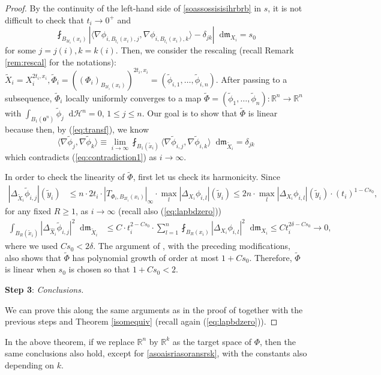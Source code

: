 \documentclass[11pt,reqno]{amsart}
\theoremstyle{definition}
\numberwithin{equation}{section}
\newcommand{\bo}{\bm{0}}
\newcommand{\di}{\mathop{}\!\mathrm{d}}
\newcommand{\meas}{\mathfrak{m}}
\newcommand{\haus}{\mathscr{H}}
\begin{document}
\begin{proof}
By the continuity of the left-hand side of \eqref{soassossisisihrbrb} in $s$,
it is not difficult to check that $t_i \to 0^+$ and
\begin{equation}\label{eq:contradiction1}
    \fint_{B_{3t_i}(x_i)}\left| \langle \nabla \phi_{i, B_{t_i}(x_i), j}, \nabla \phi_{i, B_{t_i}(x_i), k}\rangle -\delta_{jk} \right|\di \meas_{X_i} = s_0
\end{equation}
for some $j=j(i), k=k(i)$. 
Then, we consider the rescaling (recall Remark \ref{rem:rescal} for the notations):
$
    \tilde X_i=X_i^{2t_i, x_i}, \tilde \Phi_i= ((\Phi_i)_{B_{2t_i}(x_i)})^{2t_i, x_i}=(\tilde \phi_{i,1},\ldots, \tilde \phi_{i, n}).
$
After passing to a subsequence, $\tilde \Phi_i$ locally uniformly converges to a map $\tilde \Phi=(\tilde \phi_1, \ldots, \tilde \phi_n):\mathbb{R}^n \to \mathbb{R}^n$ with $\int_{B_1(\bo^n)}\tilde \phi_j\di \haus^n=0$, $1\leq j\leq n$. Our goal is to show that $\tilde \Phi$ is linear because then, by (\ref{eq:transf}), we know
\begin{equation}
    \langle \nabla \tilde \phi_j, \nabla \tilde \phi_k\rangle \equiv \lim_{i\to \infty}\fint_{B_1(\tilde x_i)}\langle \nabla \tilde \phi_{i, j}, \nabla \tilde \phi_{i, k}\rangle \di \meas_{\tilde X_i}=\delta_{jk} 
\end{equation}
which contradicts (\ref{eq:contradiction1}) as $i \to \infty$.

In order to check the linearity of $\tilde \Phi$, first let us check its harmonicity.
Since
\begin{align} |\Delta_{\tilde X_i}\tilde \phi_{i, j}|(\tilde y_i) &\le  n\cdot 2t_i \cdot |T_{\Phi_i, B_{2t_i}(x_i)}|_{\infty}\cdot \max_l|\Delta_{X_i}\phi_{i, l}|(\tilde y_i)  \le 2n \cdot \max_l|\Delta_{X_i} \phi_{i, l}|(\tilde y_i) \cdot (t_i)^{1-Cs_0}, 
\end{align}
 for any fixed $R \ge 1$,  as $i \to \infty$ (recall also (\ref{eq:lapbdzero})) 
\begin{align}
    \int_{B_R(\tilde x_i)}|\Delta_{\hat X_i}\tilde \phi_{i, j}|^2\di \meas_{\tilde X_i}&\le C \cdot t_i^{2-Cs_0}\cdot \sum_{l=1}^n\fint_{B_R(x_i)}|\Delta_{X_i}\phi_{i, l}|^2\di \meas_{X_i}  \le Ct_i^{2\delta-Cs_0} \to 0,
\end{align} 
where we used $Cs_0<2\delta$.  
The argument of \cite[Proposition 3.7]{HP}, with the preceding modifications, also shows that $\tilde\Phi$ has polynomial growth of order at most $1+Cs_0$.
Therefore, $\widetilde{\Phi}$ is linear when $s_0$ is chosen so that $1+Cs_0<2$.

\smallskip

\textbf{Step 3}: \textit{Conclusions.}

\smallskip

We can prove this along the same arguments as in the proof of \cite[Proposition 4.7]{HP} together with the previous steps and Theorem \ref{isomequiv} (recall again (\ref{eq:lapbdzero})).
\end{proof}
    In the above theorem, if we replace $\mathbb{R}^n$ by $\mathbb{R}^k$ as the target space of $\Phi$, then the same conclusions also hold, except for \eqref{asoaisriasoransrsk}, with the constants also depending on $k$.
\end{document}
